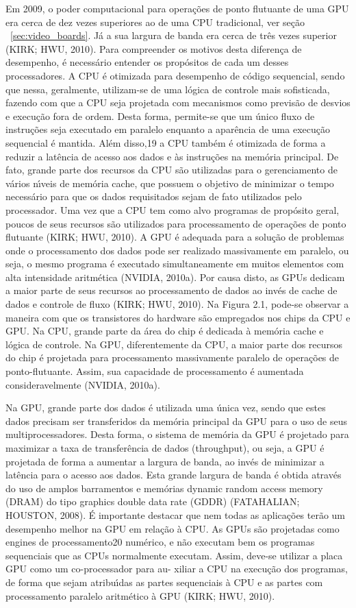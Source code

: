 Em 2009, o poder computacional para operações de ponto flutuante de uma GPU
era cerca de dez vezes superiores ao de uma CPU tradicional, ver seção ~\ref{sec:video_boards}. Já a sua largura de
banda era cerca de três vezes superior (KIRK; HWU, 2010). Para compreender os
motivos desta diferença de desempenho, é necessário entender os propósitos de cada
um desses processadores.
A CPU é otimizada para desempenho de código sequencial, sendo que nessa,
geralmente, utilizam-se de uma lógica de controle mais sofisticada, fazendo com que
a CPU seja projetada com mecanismos como previsão de desvios e execução fora de
ordem. Desta forma, permite-se que um único fluxo de instruções seja executado em
paralelo enquanto a aparência de uma execução sequencial é mantida. Além disso,19
a CPU também é otimizada de forma a reduzir a latência de acesso aos dados e às
instruções na memória principal. De fato, grande parte dos recursos da CPU são
utilizadas para o gerenciamento de vários nı́veis de memória cache, que possuem o
objetivo de minimizar o tempo necessário para que os dados requisitados sejam de
fato utilizados pelo processador. Uma vez que a CPU tem como alvo programas
de propósito geral, poucos de seus recursos são utilizados para processamento de
operações de ponto flutuante (KIRK; HWU, 2010).
A GPU é adequada para a solução de problemas onde o processamento dos
dados pode ser realizado massivamente em paralelo, ou seja, o mesmo programa
é executado simultaneamente em muitos elementos com alta intensidade aritmética
(NVIDIA, 2010a). Por causa disto, as GPUs dedicam a maior parte de seus recursos
ao processamento de dados ao invés de cache de dados e controle de fluxo (KIRK;
HWU, 2010).
Na Figura 2.1, pode-se observar a maneira com que os transistores do hardware
são empregados nos chips da CPU e GPU. Na CPU, grande parte da área do chip é
dedicada à memória cache e lógica de controle. Na GPU, diferentemente da CPU,
a maior parte dos recursos do chip é projetada para processamento massivamente
paralelo de operações de ponto-flutuante. Assim, sua capacidade de processamento
é aumentada consideravelmente (NVIDIA, 2010a).

Na GPU, grande parte dos dados é utilizada uma única vez, sendo que estes
dados precisam ser transferidos da memória principal da GPU para o uso de seus
multiprocessadores. Desta forma, o sistema de memória da GPU é projetado para
maximizar a taxa de transferência de dados (throughput), ou seja, a GPU é projetada
de forma a aumentar a largura de banda, ao invés de minimizar a latência para o
acesso aos dados. Esta grande largura de banda é obtida através do uso de amplos
barramentos e memórias dynamic random access memory (DRAM) do tipo graphics
double data rate (GDDR) (FATAHALIAN; HOUSTON, 2008).
É importante destacar que nem todas as aplicações terão um desempenho melhor
na GPU em relação à CPU. As GPUs são projetadas como engines de processamento20
numérico, e não executam bem os programas sequenciais que as CPUs normalmente
executam. Assim, deve-se utilizar a placa GPU como um co-processador para au-
xiliar a CPU na execução dos programas, de forma que sejam atribuı́das as partes
sequenciais à CPU e as partes com processamento paralelo aritmético à GPU (KIRK;
HWU, 2010).

